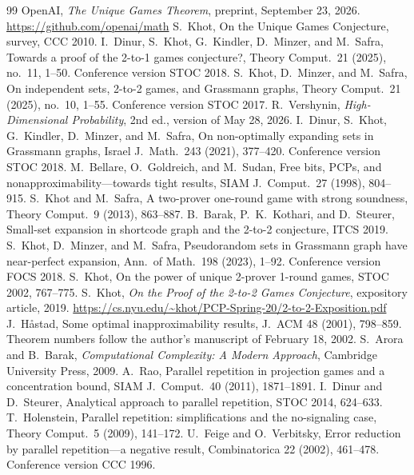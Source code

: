 \begin{thebibliography}{99}
 OpenAI, \emph{The Unique Games Theorem}, preprint, September 23, 2026. \url{https://github.com/openai/math}
 S.~Khot, On the Unique Games Conjecture, survey, CCC 2010.
 I.~Dinur, S.~Khot, G.~Kindler, D.~Minzer, and M.~Safra, Towards a proof of the 2-to-1 games conjecture?, Theory Comput.\ 21 (2025), no.~11, 1--50. Conference version STOC 2018.
 S.~Khot, D.~Minzer, and M.~Safra, On independent sets, 2-to-2 games, and Grassmann graphs, Theory Comput.\ 21 (2025), no.~10, 1--55. Conference version STOC 2017.
 R.~Vershynin, \emph{High-Dimensional Probability}, 2nd ed., version of May 28, 2026.
 I.~Dinur, S.~Khot, G.~Kindler, D.~Minzer, and M.~Safra, On non-optimally expanding sets in Grassmann graphs, Israel J.\ Math.\ 243 (2021), 377--420. Conference version STOC 2018.
 M.~Bellare, O.~Goldreich, and M.~Sudan, Free bits, PCPs, and nonapproximability---towards tight results, SIAM J.\ Comput.\ 27 (1998), 804--915.
 S.~Khot and M.~Safra, A two-prover one-round game with strong soundness, Theory Comput.\ 9 (2013), 863--887.
 B.~Barak, P.~K.~Kothari, and D.~Steurer, Small-set expansion in shortcode graph and the 2-to-2 conjecture, ITCS 2019.
 S.~Khot, D.~Minzer, and M.~Safra, Pseudorandom sets in Grassmann graph have near-perfect expansion, Ann.\ of Math.\ 198 (2023), 1--92. Conference version FOCS 2018.
 S.~Khot, On the power of unique 2-prover 1-round games, STOC 2002, 767--775.
 S.~Khot, \emph{On the Proof of the 2-to-2 Games Conjecture}, expository article, 2019. \url{https://cs.nyu.edu/~khot/PCP-Spring-20/2-to-2-Exposition.pdf}
 J.~H\aa stad, Some optimal inapproximability results, J.\ ACM 48 (2001), 798--859. Theorem numbers follow the author's manuscript of February 18, 2002.
 S.~Arora and B.~Barak, \emph{Computational Complexity: A Modern Approach}, Cambridge University Press, 2009.
 A.~Rao, Parallel repetition in projection games and a concentration bound, SIAM J.\ Comput.\ 40 (2011), 1871--1891.
 I.~Dinur and D.~Steurer, Analytical approach to parallel repetition, STOC 2014, 624--633.
 T.~Holenstein, Parallel repetition: simplifications and the no-signaling case, Theory Comput.\ 5 (2009), 141--172.
 U.~Feige and O.~Verbitsky, Error reduction by parallel repetition---a negative result, Combinatorica 22 (2002), 461--478. Conference version CCC 1996.
\end{thebibliography}
